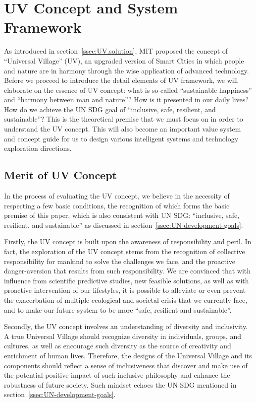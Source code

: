 \documentclass[letterpaper, twocolumn, 10pt, conference]{IEEEtran}
\begin{document}
\section{UV Concept and System Framework} 
\label{sec:UVConcept}
                
As introduced in section~\ref{ssec:UV.solution}, MIT proposed the concept of \enquote{Universal Village} (UV), an upgraded version of Smart Cities in which people and nature are in harmony through the wise application of advanced technology. 
Before we proceed to introduce the detail elements of UV framework, we will elaborate on the essence of UV concept: what is so-called \enquote{sustainable happiness} and \enquote{harmony between man and nature}?  How is it presented in our daily lives? 
How do we achieve the UN SDG goal of  \enquote{inclusive, safe, resilient, and sustainable}?
This is the theoretical premise that we must focus on in order to understand the UV concept. This will also become an important value system and concept guide for us to design various intelligent systems and technology exploration directions.

\subsection{Merit of UV Concept}
\label{ssec:UVMerit}

In the process of evaluating the UV concept, we believe in the necessity of respecting a few basic conditions, the recognition of which forms the basic premise of this paper, which is also consistent with UN SDG: \enquote{inclusive, safe, resilient, and sustainable} as discussed in section~\ref{ssec:UN-development-goals}.

Firstly, the UV concept is built upon the awareness of responsibility and peril. In fact, the exploration of the UV concept stems from the recognition of collective responsibility for mankind to solve the challenges we face, and the proactive danger-aversion that results from such responsibility. We are convinced that with influence from scientific predictive studies, new feasible solutions, as well as with proactive intervention of our lifestyles, it is possible to alleviate or even prevent the exacerbation of multiple ecological and societal crisis that we currently face, and to make our future system to be more \enquote{safe, resilient and sustainable}. 

Secondly, the UV concept involves an understanding of diversity and inclusivity. A true Universal Village should recognize diversity in individuals, groups, and cultures, as well as encourage such diversity as the source of creativity and enrichment of human lives. Therefore, the designs of the Universal Village and its components should reflect a sense of inclusiveness that discover and make use of the potential positive impact of such inclusive philosophy and enhance the robustness of future society. Such mindset echoes the UN SDG mentioned in section~\ref{ssec:UN-development-goals}.
\end{document}
